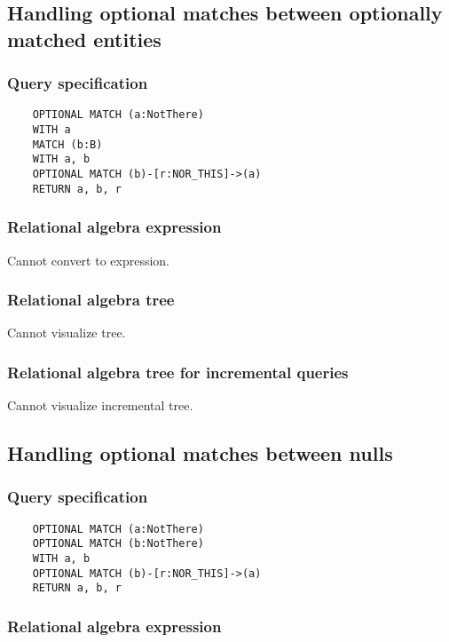 	\subsection{Handling optional matches between optionally matched entities}

	\subsubsection*{Query specification}

	\begin{lstlisting}
	OPTIONAL MATCH (a:NotThere)
	WITH a
	MATCH (b:B)
	WITH a, b
	OPTIONAL MATCH (b)-[r:NOR_THIS]->(a)
	RETURN a, b, r
	\end{lstlisting}


	\subsubsection*{Relational algebra expression}

	Cannot convert to expression.

	\subsubsection*{Relational algebra tree}

	Cannot visualize tree.

	\subsubsection*{Relational algebra tree for incremental queries}

	Cannot visualize incremental tree.
	\subsection{Handling optional matches between nulls}

	\subsubsection*{Query specification}

	\begin{lstlisting}
	OPTIONAL MATCH (a:NotThere)
	OPTIONAL MATCH (b:NotThere)
	WITH a, b
	OPTIONAL MATCH (b)-[r:NOR_THIS]->(a)
	RETURN a, b, r
	\end{lstlisting}


	\subsubsection*{Relational algebra expression}

